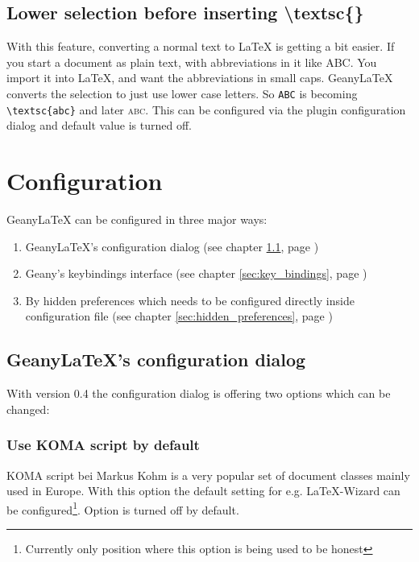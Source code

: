 \documentclass[%
paper=a4,%
fontsize=11pt,%
twoside=false,%
DIV18,%
headsepline,%
plainheadsepline,%
footsepline,%
plainfootsepline,%
bibliography=totoc,%
listof=totoc,%
BCOR10mm,%
parskip=half,%
openany,%
]{scrartcl}
\begin{document}
\subsection{Lower selection before inserting \textbackslash{}textsc\{\}}

With this feature, converting a normal text to \LaTeX{} is getting a
bit easier. If you start a document as plain text, with
abbreviations in it like ABC. You import it into \LaTeX{}, and want
the abbreviations in small caps. Geany\LaTeX{} converts the
selection to just use lower case letters. So \texttt{ABC} is
becoming \texttt{\textbackslash{}textsc\{abc\}} and later \textsc
{abc}. This can be configured via the plugin configuration dialog
and default value is turned off.

\section{Configuration}

GeanyLaTeX{} can be configured in three major ways:
\begin{enumerate}
\item GeanyLaTeX{}'s configuration dialog (see chapter \ref{sec:configuration_dialog},
	page \pageref{sec:configuration_dialog})
\item Geany's keybindings interface (see chapter \ref{sec:key_bindings},
	page \pageref{sec:key_bindings})
\item By hidden preferences which needs to be configured directly inside
	  configuration file (see chapter \ref{sec:hidden_preferences},
	page \pageref{sec:hidden_preferences})
\end{enumerate}

\subsection{GeanyLaTeX{}'s configuration dialog}
\label{sec:configuration_dialog}
With version 0.4 the configuration dialog is offering two options which
can be changed:

\subsubsection{Use KOMA script by default}
KOMA script bei Markus Kohm is a very popular set of document classes
mainly used in Europe. With this option the default setting for e.g.
\LaTeX{}-Wizard can be configured\footnote{Currently only position where
this option is being used to be honest}. Option is turned off by default.
\end{document}
